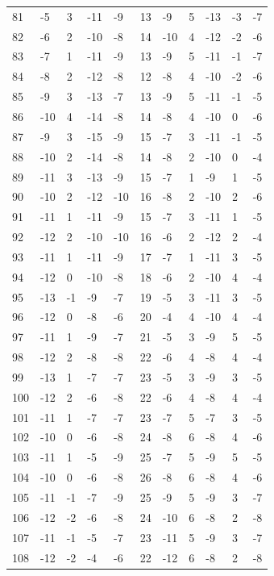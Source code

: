 \begin{table}[H]
\begin{tabular}{lllllllllll}
81 & -5 & 3 & -11 & -9 & 13 & -9 & 5 & -13 & -3 & -7 \\
82 & -6 & 2 & -10 & -8 & 14 & -10 & 4 & -12 & -2 & -6 \\
83 & -7 & 1 & -11 & -9 & 13 & -9 & 5 & -11 & -1 & -7 \\
84 & -8 & 2 & -12 & -8 & 12 & -8 & 4 & -10 & -2 & -6 \\
85 & -9 & 3 & -13 & -7 & 13 & -9 & 5 & -11 & -1 & -5 \\
86 & -10 & 4 & -14 & -8 & 14 & -8 & 4 & -10 & 0 & -6 \\
87 & -9 & 3 & -15 & -9 & 15 & -7 & 3 & -11 & -1 & -5 \\
88 & -10 & 2 & -14 & -8 & 14 & -8 & 2 & -10 & 0 & -4 \\
89 & -11 & 3 & -13 & -9 & 15 & -7 & 1 & -9 & 1 & -5 \\
90 & -10 & 2 & -12 & -10 & 16 & -8 & 2 & -10 & 2 & -6 \\
91 & -11 & 1 & -11 & -9 & 15 & -7 & 3 & -11 & 1 & -5 \\
92 & -12 & 2 & -10 & -10 & 16 & -6 & 2 & -12 & 2 & -4 \\
93 & -11 & 1 & -11 & -9 & 17 & -7 & 1 & -11 & 3 & -5 \\
94 & -12 & 0 & -10 & -8 & 18 & -6 & 2 & -10 & 4 & -4 \\
95 & -13 & -1 & -9 & -7 & 19 & -5 & 3 & -11 & 3 & -5 \\
96 & -12 & 0 & -8 & -6 & 20 & -4 & 4 & -10 & 4 & -4 \\
97 & -11 & 1 & -9 & -7 & 21 & -5 & 3 & -9 & 5 & -5 \\
98 & -12 & 2 & -8 & -8 & 22 & -6 & 4 & -8 & 4 & -4 \\
99 & -13 & 1 & -7 & -7 & 23 & -5 & 3 & -9 & 3 & -5 \\
100 & -12 & 2 & -6 & -8 & 22 & -6 & 4 & -8 & 4 & -4 \\
101 & -11 & 1 & -7 & -7 & 23 & -7 & 5 & -7 & 3 & -5 \\
102 & -10 & 0 & -6 & -8 & 24 & -8 & 6 & -8 & 4 & -6 \\
103 & -11 & 1 & -5 & -9 & 25 & -7 & 5 & -9 & 5 & -5 \\
104 & -10 & 0 & -6 & -8 & 26 & -8 & 6 & -8 & 4 & -6 \\
105 & -11 & -1 & -7 & -9 & 25 & -9 & 5 & -9 & 3 & -7 \\
106 & -12 & -2 & -6 & -8 & 24 & -10 & 6 & -8 & 2 & -8 \\
107 & -11 & -1 & -5 & -7 & 23 & -11 & 5 & -9 & 3 & -7 \\
108 & -12 & -2 & -4 & -6 & 22 & -12 & 6 & -8 & 2 & -8 \\

\end{tabular}
\end{table}
